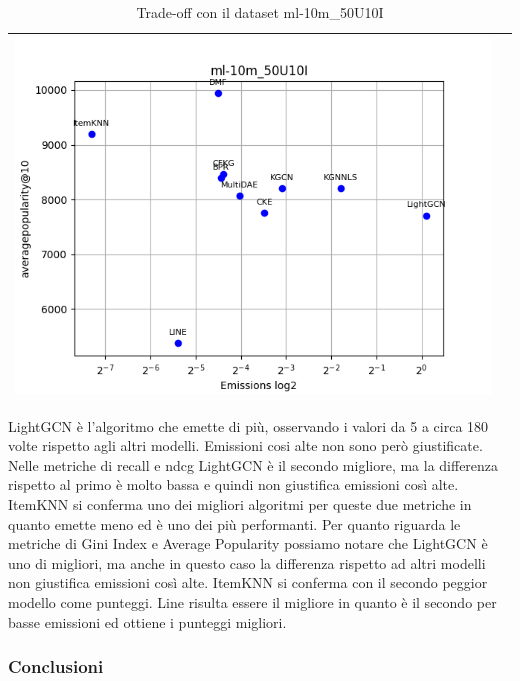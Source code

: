 \begin{table}[H]
\begin{tabularx}{\textwidth}{|X|X|}
        \includegraphics[width=\linewidth, trim=0 0 0 0]{images/averagepopularity@10_ml-10m_50U10I.png} \\
        \hline
    \end{tabularx}
    \caption{Trade-off con il dataset ml-10m\_50U10I}
    \label{tab:emissions_info}
\end{table}

\noindent LightGCN è l'algoritmo che emette di più, osservando i valori da 5 a circa 180 volte rispetto agli altri modelli.
Emissioni cosi alte non sono però giustificate. Nelle metriche di recall e ndcg LightGCN è il secondo migliore, ma la differenza rispetto al primo è molto bassa e quindi non giustifica emissioni così alte.
ItemKNN si conferma uno dei migliori algoritmi per queste due metriche in quanto emette meno ed è uno dei più performanti.
Per quanto riguarda le metriche di Gini Index e Average Popularity possiamo notare che LightGCN è uno di migliori, ma anche in questo caso la differenza rispetto ad altri modelli non giustifica emissioni così alte. ItemKNN si conferma con il secondo peggior modello come punteggi. Line risulta essere il migliore in quanto è il secondo per basse emissioni ed ottiene i punteggi migliori. 

\subsubsection{Conclusioni}


